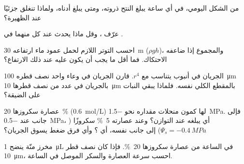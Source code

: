 \begin{exercise}[$\star$]\label{exo:b1:plant-transport:3}
من الشكل اليومي، في أي ساعة يبلغ النتح ذروته، ومتى يبلغ   أدناه، ولماذا تنغلق  جزئيًا عند الظهيرة؟
\end{exercise}

\begin{exercise}[$\star$]\label{exo:b1:plant-transport:4}
عرّف  ، وقل ماذا يحدث عند كل منهما في .
\end{exercise}

\begin{exercise}[$\star\star$]\label{exo:b1:plant-transport:5}
احسب التوتر اللازم لحمل عمود ماء ارتفاعه \qty{30}{m}
($\rho g h$)، والمجموع إذا ضاعفه الاحتكاك. فما أقل ما يجب أن يكون
عليه   عند ذلك الارتفاع؟
\end{exercise}

\begin{exercise}[$\star\star$]\label{exo:b1:plant-transport:6}
الجريان في أنبوب يتناسب مع $r^4$. قارن الجريان في وعاء واحد نصف
قطره \qty{100}{\micro m} بالجريان في عدد من  نصف قطرها
\qty{10}{\micro m} بالمقطع الكلي نفسه. فلماذا يبقي النبات على
الضيقة؟
\end{exercise}

\begin{exercise}[$\star\star$]\label{exo:b1:plant-transport:7}
عصارة  سكروزها \qty{20}{\%} (\qty{0.6}{mol/L}) لها كمون منحلات
مقداره نحو \qty{-1.5}{MPa}. فإلى جانب  عند \qty{-0.5}{MPa}،
أي  يبلغه  عند التوازن؟ وعند  عصارته
\qty{5}{\%} سكروزًا ($\Psi_s = \qty{-0.4}{MPa}$) إلى جانب 
نفسه، أي ؟ وأي فرق ضغط يسوق الجريان؟
\end{exercise}

\begin{exercise}[$\star\star$]\label{exo:b1:plant-transport:8}
مخرز منّة ينضح \qty{1}{\micro L} في الساعة من عصارة سكروزها
\qty{20}{\%}. فإذا كان نصف قطر  \qty{10}{\micro m}،
احسب سرعة العصارة والسكر الموصل في الساعة.
\end{exercise}


